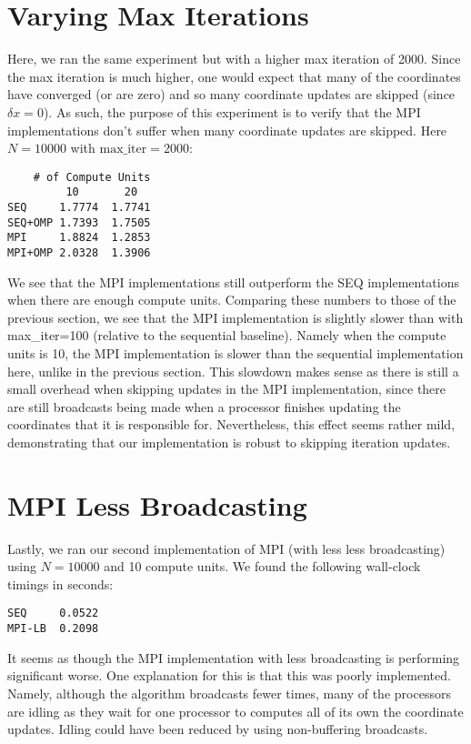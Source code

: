 \documentclass{article}
\begin{document}
\section*{Varying Max Iterations}
Here, we ran the same experiment but with a higher max iteration of 2000. Since the max iteration is much higher, one would expect that many of the coordinates have converged (or are zero) and so many coordinate updates are skipped (since $\delta x = 0$). As such, the purpose of this experiment is to verify that the MPI implementations don't suffer when many coordinate updates are skipped. Here $N = 10000$ with $\text{max\_iter} = 2000$:
\begin{verbatim}
    # of Compute Units
         10       20
SEQ     1.7774  1.7741
SEQ+OMP 1.7393  1.7505
MPI     1.8824  1.2853
MPI+OMP 2.0328  1.3906
\end{verbatim}
We see that the MPI implementations still outperform the SEQ implementations when there are enough compute units. Comparing these numbers to those of the previous section, we see that the MPI implementation is slightly slower than with max\_iter=100 (relative to the sequential baseline). Namely when the compute units is 10, the MPI implementation is slower than the sequential implementation here, unlike in the previous section. This slowdown makes sense as there is still a small overhead when skipping updates in the MPI implementation, since there are still broadcasts being made when a processor finishes updating the coordinates that it is responsible for. Nevertheless, this effect seems rather mild, demonstrating that our implementation is robust to skipping iteration updates. 

\section*{MPI Less Broadcasting}
Lastly, we ran our second implementation of MPI (with less less broadcasting) using $N = 10000$ and 10 compute units. We found the following wall-clock timings in seconds:
\begin{verbatim}
SEQ     0.0522
MPI-LB  0.2098
\end{verbatim}
It seems as though the MPI implementation with less broadcasting is performing significant worse. One explanation for this is that this was poorly implemented. Namely, although the algorithm broadcasts fewer times, many of the processors are idling as they wait for one processor to computes all of its own the coordinate updates. Idling could have been reduced by using non-buffering broadcasts.
\end{document}
